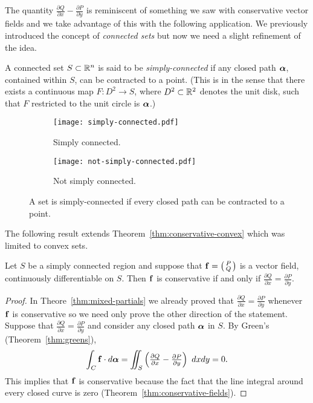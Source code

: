 The quantity \(\tfrac{\partial Q}{\partial x} - \tfrac{\partial P}{\partial y}\) is reminiscent of something we saw with conservative vector fields and we take advantage of this with the following application.
We previously introduced the concept of \emph{connected sets} but now we need a slight refinement of the idea.
%
\begin{definition}%
    \label{def:simply-connected}
    A connected set \(S\subset \mathbb{R}^n\) is said to be \emph{simply-connected} if any closed path \(\boldsymbol{\alpha}\), contained within \(S\), can be contracted to a point.
    (This is in the sense that there exists a continuous map \(F:D^{2}\to S\), where \(D^2\subset \mathbb{R}^2\) denotes the unit disk, such that \(F\) restricted  to the unit circle is \(\boldsymbol{\alpha}\).)
\end{definition}
%
\begin{figure}
    \centering
    \begin{subfigure}[b]{0.5\textwidth}
        \centering
        \texttt{[image: simply-connected.pdf]}
        \caption{Simply connected.}
    \end{subfigure}%
    \begin{subfigure}[b]{0.5\textwidth}
        \centering
        \texttt{[image: not-simply-connected.pdf]}
        \caption{Not simply connected.}
    \end{subfigure}
    \caption{A set is simply-connected if every closed path can be contracted to a point.}
\end{figure}

The following result extends Theorem~\ref{thm:conservative-convex} which was limited to convex sets.
%
\begin{theorem}%
    \label{thm:conservative-fields-simply-connected}
    Let \(S\) be a simply connected region and suppose that \(\mathbf{f} = \left(\begin{smallmatrix}
            P \\ Q
        \end{smallmatrix}\right)\)
    is a vector field, continuously differentiable on \(S\).
    Then \(\mathbf{f}\) is conservative if and only if \(\tfrac{\partial Q}{\partial x} = \tfrac{\partial P}{\partial y}\).
\end{theorem}

\begin{proof}
    In Theore~\ref{thm:mixed-partials} we already proved that \(\tfrac{\partial Q}{\partial x} = \tfrac{\partial P}{\partial y}\) whenever \(\mathbf{f}\) is conservative so we need only prove the other direction of the statement.
    Suppose that  \(\tfrac{\partial Q}{\partial x} = \tfrac{\partial P}{\partial y}\) and consider any closed path \(\boldsymbol{\alpha}\) in \(S\).
    By Green's (Theorem~\ref{thm:greens}),
    \[
        \int_{C} \mathbf{f} \cdot d\boldsymbol{\alpha} = \iint_{S} \left(\tfrac{\partial Q}{\partial x} - \tfrac{\partial P}{\partial y}\right) \ dx dy = 0.
    \]
    This implies that \(\mathbf{f}\) is conservative because the fact that the line integral around every closed curve is zero (Theorem~\ref{thm:conservative-fields}).
\end{proof}

